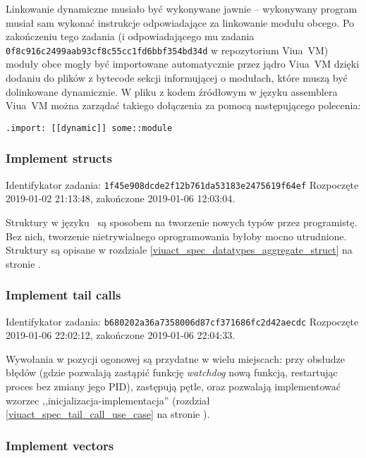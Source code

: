 Linkowanie dynamiczne musiało być wykonywane jawnie -- wykonywany program musiał
sam wykonać instrukcje odpowiadające za linkowanie modułu obcego. Po zakończeniu
tego zadania (i odpowiadającego mu zadania
\texttt{0f8c916c2499aab93cf8c55cc1fd6bbf354bd34d} w repozytorium Viua~VM) moduły
obce mogły być importowane automatycznie przez jądro Viua~VM dzięki dodaniu do
plików z bytecode sekcji informującej o modułach, które muszą być dolinkowane
dynamicznie. W pliku z kodem źródłowym w języku assemblera Viua~VM można
zarządać takiego dołączenia za pomocą następującego polecenia:
\begin{lstlisting}
.import: [[dynamic]] some::module
\end{lstlisting}

\subsubsection{Implement structs}

Identifykator zadania: \texttt{1f45e908dcde2f12b761da53183e2475619f64ef}
\newline
Rozpoczęte 2019-01-02 21:13:48, zakończone 2019-01-06 12:03:04.
\newline

Struktury w języku \ViuAct\ są sposobem na tworzenie nowych typów przez
programistę. Bez nich, tworzenie nietrywialnego oprogramowania byłoby mocno
utrudnione. Struktury są opisane w rozdziale \ref{viuact_spec_datatypes_aggregate_struct}
na stronie \pageref{viuact_spec_datatypes_aggregate_struct}.

\subsubsection{Implement tail calls}

Identifykator zadania: \texttt{b680202a36a7358006d87cf371686fc2d42aecdc}
\newline
Rozpoczęte 2019-01-06 22:02:12, zakończone 2019-01-06 22:04:33.
\newline

Wywołania w pozycji ogonowej są przydatne w wielu miejscach: przy obsłudze
błędów (gdzie pozwalają zastąpić funkcję \emph{watchdog} nową funkcją,
restartując proces bez zmiany jego PID), zastępują pętle, oraz pozwalają
implementować wzorzec ,,inicjalizacja-implementacja'' (rozdział
\ref{viuact_spec_tail_call_use_case} na stronie
\pageref{viuact_spec_tail_call_use_case}).

\subsubsection{Implement vectors}

